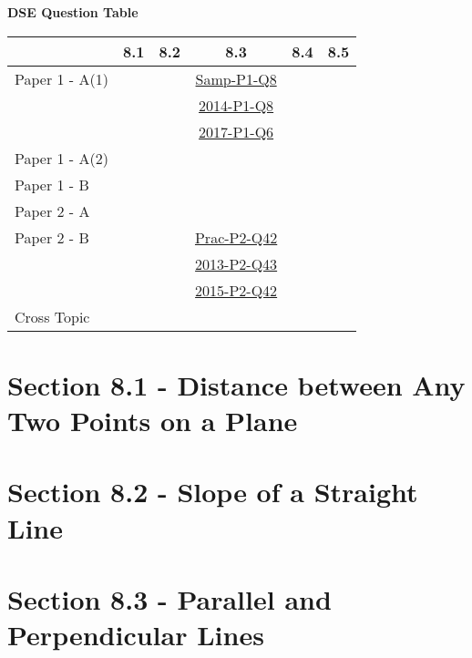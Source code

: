 \documentclass[12pt, a4paper]{article}
\begin{document}
\begin{absolutelynopagebreak}
\begin{center}
\textbf{DSE Question Table}
\end{center}
\begin{center}
\begin{tabular}{|l|c|c|c|c|c|}
\hline
        & 8.1 & 8.2 & 8.3 & 8.4 & 8.5 \\\hline
\hline
Paper 1 - A(1)&  &  & \hyperref[DSE2012S-CoreP1-Q08]{Samp-P1-Q8} &  &  \\
&  &  & \hyperref[DSE2014-CoreP1-Q08]{2014-P1-Q8} &  &  \\
&  &  & \hyperref[DSE2017-CoreP1-Q06]{2017-P1-Q6} &  &  \\
\hline
Paper 1 - A(2)&  &  &  &  &  \\
\hline
Paper 1 - B&  &  &  &  &  \\
\hline
\hline
Paper 2 - A&  &  &  &  &  \\
\hline
Paper 2 - B&  &  & \hyperref[DSE2012P-CoreP2-Q42]{Prac-P2-Q42} &  &  \\
&  &  & \hyperref[DSE2013-CoreP2-Q43]{2013-P2-Q43} &  &  \\
&  &  & \hyperref[DSE2015-CoreP2-Q42]{2015-P2-Q42} &  &  \\
\hline
\hline
Cross Topic&  &  &  &  &  \\
\hline
\end{tabular}
\end{center}
\end{absolutelynopagebreak}




\section*{Section 8.1 - Distance between Any Two Points on a Plane}\label{section:3-8-1}





\section*{Section 8.2 - Slope of a Straight Line}\label{section:3-8-2}





\section*{Section 8.3 - Parallel and Perpendicular Lines}\label{section:3-8-3}
\end{document}

